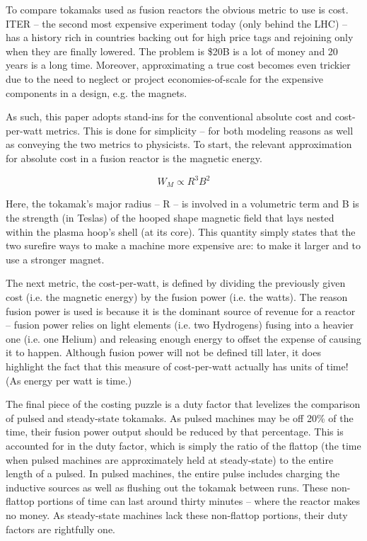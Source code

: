To compare tokamaks used as fusion reactors the obvious metric to use is cost. ITER -- the second most expensive experiment today (only behind the LHC) -- has a history rich in countries backing out for high price tags and rejoining only when they are finally lowered. The problem is \$20B is a lot of money and 20 years is a long time. Moreover, approximating a true cost becomes even trickier due to the need to neglect or project economies-of-scale for the expensive components in a design, e.g. the magnets.

As such, this paper adopts stand-ins for the conventional absolute cost and cost-per-watt metrics. This is done for simplicity -- for both modeling reasons as well as conveying the two metrics to physicists. To start, the relevant approximation for absolute cost in a fusion reactor is the magnetic energy.

\begin{equation}
	W_M \propto R^3 B^2
\end{equation}

Here, the tokamak's major radius -- R -- is involved in a volumetric term and B is the strength (in Teslas) of the hooped shape magnetic field that lays nested within the plasma hoop's shell (at its core). This quantity simply states that the two surefire ways to make a machine more expensive are: to make it larger and to use a stronger magnet.

The next metric, the cost-per-watt, is defined by dividing the previously given cost (i.e. the magnetic energy) by the fusion power (i.e. the watts). The reason fusion power is used is because it is the dominant source of revenue for a reactor -- fusion power relies on light elements (i.e. two Hydrogens) fusing into a heavier one (i.e. one Helium) and releasing enough energy to offset the expense of causing it to happen. Although fusion power will not be defined till later, it does highlight the fact that this measure of cost-per-watt actually has units of time! (As energy per watt is time.)

The final piece of the costing puzzle is a duty factor that levelizes the comparison of pulsed and steady-state tokamaks. As pulsed machines may be off 20\% of the time, their fusion power output should be reduced by that percentage. This is accounted for in the duty factor, which is simply the ratio of the flattop (the time when pulsed machines are approximately held at steady-state) to the entire length of a pulsed. In pulsed machines, the entire pulse includes charging the inductive sources as well as flushing out the tokamak between runs. These non-flattop portions of time can last around thirty minutes -- where the reactor makes no money. As steady-state machines lack these non-flattop portions, their duty factors are rightfully one.

